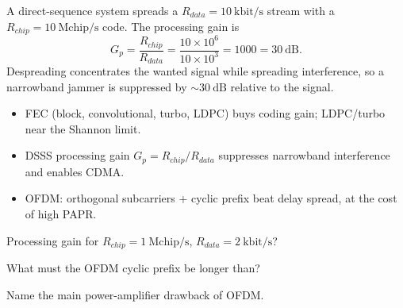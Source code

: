 \begin{workedexample}
A direct-sequence system spreads a $R_{data} = 10\ \text{kbit/s}$ stream
with a $R_{chip} = 10\ \text{Mchip/s}$ code. The processing gain is
\[ G_p = \frac{R_{chip}}{R_{data}} = \frac{10\times10^{6}}{10\times10^{3}} = 1000 = 30\ \text{dB}. \]
Despreading concentrates the wanted signal while spreading interference, so a
narrowband jammer is suppressed by $\sim30\ \text{dB}$ relative to the signal.
\end{workedexample}

\begin{keytakeaways}
\begin{itemize}[leftmargin=1.4em,itemsep=2pt]
\item FEC (block, convolutional, turbo, LDPC) buys coding gain; LDPC/turbo near the Shannon limit.
\item DSSS processing gain $G_p = R_{chip}/R_{data}$ suppresses narrowband interference and enables CDMA.
\item OFDM: orthogonal subcarriers + cyclic prefix beat delay spread, at the cost of high PAPR.
\end{itemize}
\end{keytakeaways}

\begin{exercises}
\item Processing gain for $R_{chip} = 1\ \text{Mchip/s}$, $R_{data} = 2\ \text{kbit/s}$?
\item What must the OFDM cyclic prefix be longer than?
\item Name the main power-amplifier drawback of OFDM.
\end{exercises}

